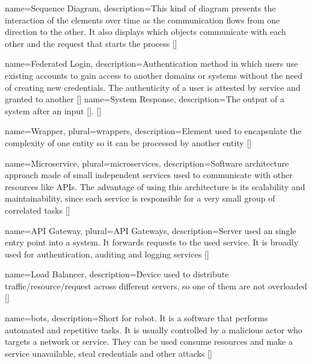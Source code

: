  {
    name={Sequence Diagram},
    description={This kind of diagram presents the interaction of the elements over time as the communication
    flows from one direction to the other. It also displays which objects communicate with each other and the 
    request that starts the process  [\cite{refmisc:sparxsD}]}
}




 {
    name={Federated Login},
    description={Authentication method in which users use existing accounts to gain access to another domains or systems
    without the need of creating new credentials. The authenticity of a user is attested by service and granted to another 
    [\cite{refonline:MRFL}]}
}
 {
    name={System Response},
    description={The output of a system after an input [\cite{refonline:HWHE}].
    [\cite{refonline:MRFL}]}
}

 {
    name={Wrapper},
    plural={wrappers},
    description={Element used to encapsulate the complexity of one entity so it can be processed by another entity 
    [\cite{refonline:techwrap}]}
}

 {
    name={Microservice},
    plural={microservices},
    description={Software architecture approach made of small independent services used to communicate with other
    resources like APIs. The advantage of using this architecture is its scalability and maintainability, since 
    each service is responsible for a very small group of correlated tasks [\cite{refonline:awsmicro}]}
}

 {
    name={API Gateway},
    plural={API Gateways},
    description={Server used an single entry point into a system. It forwards requests to the used service. It is 
    broadly used for authentication, auditing and logging services [\cite{refonline:crpag}]}
}

 {
    name={Load Balancer},
    description={Device used to distribute traffic/resource/request across different servers, so one of them
    are not overloaded [\cite{refonline:nglb}]}
}

 {
    name={bots},
    description={Short for robot. It is a software that performs automated and repetitive tasks. It is usually
    controlled by a malicious actor who targets a network or service. They can be used consume resources
    and make a service unavailable, steal credentials and other attacks [\cite{refonline:kpbot}]}
}

